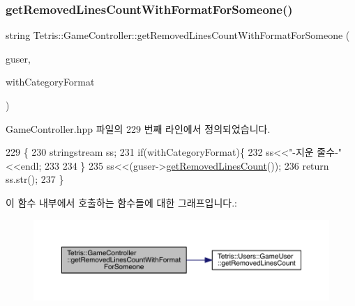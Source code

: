 \subsubsection{\texorpdfstring{get\+Removed\+Lines\+Count\+With\+Format\+For\+Someone()}{getRemovedLinesCountWithFormatForSomeone()}}
{\footnotesize\ttfamily string Tetris\+::\+Game\+Controller\+::get\+Removed\+Lines\+Count\+With\+Format\+For\+Someone (\begin{DoxyParamCaption}\item[{\hyperlink{class_tetris_1_1_users_1_1_game_user}{Game\+User} $\ast$}]{guser,  }\item[{bool}]{with\+Category\+Format }\end{DoxyParamCaption})\hspace{0.3cm}{\ttfamily [inline]}}



Game\+Controller.\+hpp 파일의 229 번째 라인에서 정의되었습니다.


\begin{DoxyCode}
229                                                                                                 \{
230             stringstream ss;
231             \textcolor{keywordflow}{if}(withCategoryFormat)\{
232                 ss<<\textcolor{stringliteral}{"-지운 줄수-"}<<endl;
233                 
234             \}
235             ss<<(guser->\hyperlink{class_tetris_1_1_users_1_1_game_user_a5912def4d9d77adbb4323b35366724af}{getRemovedLinesCount}());
236             \textcolor{keywordflow}{return} ss.str();
237         \}
\end{DoxyCode}
이 함수 내부에서 호출하는 함수들에 대한 그래프입니다.\+:
\nopagebreak
\begin{figure}[H]
\begin{center}
\leavevmode
\includegraphics[width=350pt]{db/dd2/class_tetris_1_1_game_controller_ac16414d257ffec350d6eaf47ce3ad490_cgraph}
\end{center}
\end{figure}
\mbox{\label{class_tetris_1_1_game_controller_a2e7275bdb8f29ce4f1dfec790c22705d}} 
